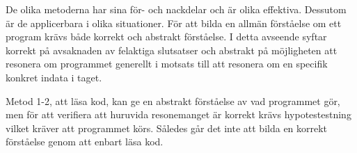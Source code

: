 

De olika metoderna har sina för- och nackdelar och är olika effektiva. Dessutom
är de applicerbara i olika situationer. För att bilda en allmän förståelse om
ett program krävs både korrekt och abstrakt förståelse. I
detta avseende syftar korrekt på avsaknaden av felaktiga slutsatser
och abstrakt på möjligheten att resonera om programmet generellt i
motsats till att resonera om en specifik konkret indata i taget.

Metod 1-2, att läsa kod, kan ge en abstrakt förståelse av vad
programmet gör, men för att verifiera att huruvida resonemanget är korrekt krävs
hypotestestning vilket kräver att programmet körs. Således går det inte att
bilda en korrekt förståelse genom att enbart läsa kod.

